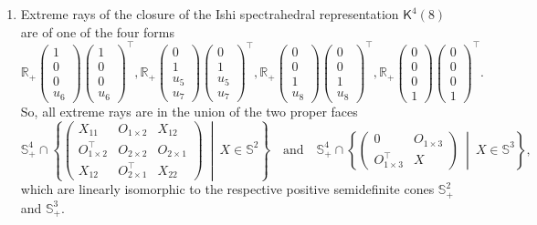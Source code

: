 \documentclass[oneside]{amsart}
\theoremstyle{plain}
\theoremstyle{definition}
\theoremstyle{remark}
\numberwithin{equation}{section}
\begin{document}
\begin{enumerate}[label=(\roman*)]
\item Extreme rays of the closure of the Ishi spectrahedral representation
$\mathsf{K}^{4}(8)$ are of one of the four forms
\[
\mathbb{R}_+
\begin{pmatrix}
1 \\ 0 \\ 0 \\ u_{6}
\end{pmatrix}
\begin{pmatrix}
1 \\ 0 \\ 0 \\ u_{6}
\end{pmatrix}^{\top},
\mathbb{R}_+
\begin{pmatrix}
0 \\ 1 \\ u_{5} \\ u_{7}
\end{pmatrix}
\begin{pmatrix}
0 \\ 1 \\ u_{5} \\ u_{7}
\end{pmatrix}^{\top},
\mathbb{R}_+
\begin{pmatrix}
0 \\ 0 \\ 1 \\ u_{8}
\end{pmatrix}
\begin{pmatrix}
0 \\ 0 \\ 1 \\ u_{8}
\end{pmatrix}^{\top},
\mathbb{R}_+
\begin{pmatrix}
0 \\ 0 \\ 0 \\ 1
\end{pmatrix}
\begin{pmatrix}
0 \\ 0 \\ 0 \\ 1
\end{pmatrix}^{\top}.
\]
So, all extreme rays are in the union of the two proper faces
\[
\mathbb{S}^{4}_{+} \cap \left\{
\begin{pmatrix}
X_{11} & O_{1 \times 2} & X_{12}
\\
O_{1 \times 2}^{\top} & O_{2 \times 2} & O_{2 \times 1}
\\
X_{12} & O_{2 \times 1}^{\top} & X_{22}
\end{pmatrix}
\ \middle|\ X \in \mathbb{S}^{2}\right\} \quad \text{and} \quad
\mathbb{S}^{4}_{+} \cap \left\{
\begin{pmatrix}
0 & O_{1 \times 3}
\\
O_{1 \times 3}^{\top} & X
\end{pmatrix}
\ \middle|\ X \in \mathbb{S}^{3}\right\},
\]
which are linearly isomorphic to the respective positive semidefinite cones
$\mathbb{S}^{2}_{+}$ and $\mathbb{S}^{3}_{+}$.


\end{enumerate}
\end{document}
